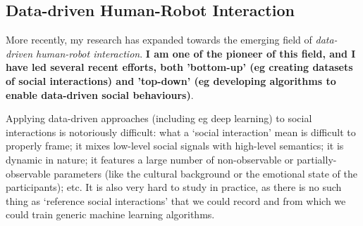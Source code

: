 %
%
%
%
%
%
%
%
%
%
%
%


\subsection{Data-driven Human-Robot Interaction}

More recently, my research has expanded towards the emerging field of
\emph{data-driven human-robot interaction}. \textbf{I am one of the pioneer of this
field, and I have led several recent efforts, both 'bottom-up' (eg creating
datasets of social interactions) and 'top-down' (eg developing algorithms to
enable data-driven social behaviours)}.

Applying data-driven approaches (including eg deep learning) to social
interactions is notoriously difficult: what a `social interaction' mean is
difficult to properly frame; it mixes low-level social signals with high-level
semantics; it is dynamic in nature; it features a large number of non-observable
or partially-observable parameters (like the cultural background or the
emotional state of the participants); etc.
It is also very hard to study in practice, as there is no such thing as
`reference social interactions' that we could record and from which we could
train generic machine learning algorithms.

